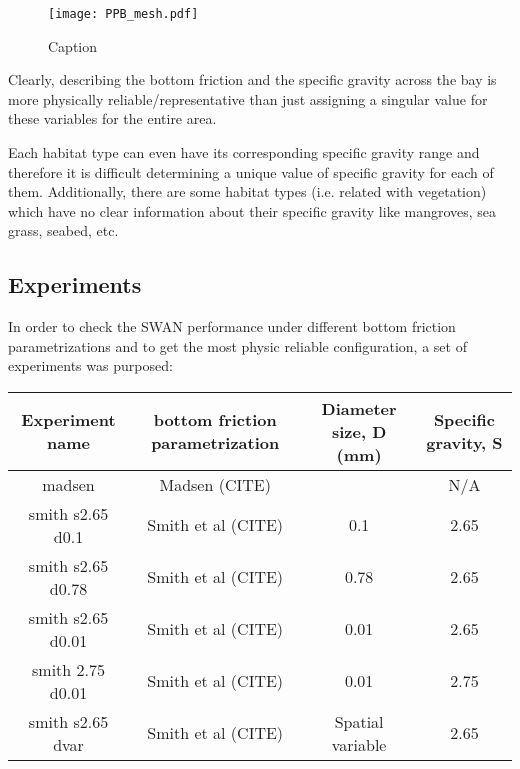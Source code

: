 \documentclass[12pt]{article}
\begin{document}
\begin{figure}
    \centering
    \texttt{[image: PPB\_mesh.pdf]}
    \caption{Caption}
    \label{fig:enter-label}
\end{figure}

Clearly, describing the bottom friction and the specific gravity across the bay is more physically reliable/representative than just assigning a singular value for these variables for the entire area.

Each habitat type can even have its corresponding specific gravity range and therefore it is difficult determining a unique value of specific gravity for each of them. Additionally, there are some habitat types (i.e. related with vegetation) which have no clear information about their specific gravity like mangroves, sea grass, seabed, etc.

\subsection{Experiments}

In order to check the SWAN performance under different bottom friction parametrizations and to get the most physic reliable configuration, a set of experiments was purposed:

\begin{table}[]
\begin{tabular}{|c|c|c|c|}
\hline
Experiment name   & bottom friction parametrization & Diameter size, D (mm) & Specific gravity, S \\ \hline
madsen            & Madsen (CITE)                   &                       & N/A                 \\ \hline
smith s2.65 d0.1  & Smith et al (CITE)              & 0.1                   & 2.65                \\ \hline
smith s2.65 d0.78 & Smith et al (CITE)              & 0.78                  & 2.65                \\ \hline
smith s2.65 d0.01 & Smith et al (CITE)              & 0.01                  & 2.65                \\ \hline
smith 2.75 d0.01  & Smith et al (CITE)              & 0.01                  & 2.75                \\ \hline
smith s2.65 dvar  & Smith et al (CITE)              & Spatial variable      & 2.65                \\ \hline
\end{tabular}
\end{table}
\end{document}
